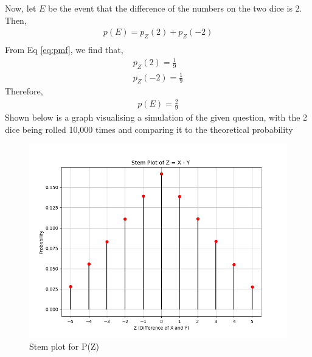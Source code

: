 \documentclass[]{article}
\begin{document}
Now, let $E$ be the event that the difference of the numbers on the two dice is 2. Then,
\begin{align}
  p(E) = p_Z(2) +p_Z(-2)\\
\end{align}
From Eq \eqref{eq:pmf}, we find that,
\begin{align}
  p_Z(2) = \frac{1}{9} \\
  p_Z(-2) = \frac{1}{9}
\end{align}
Therefore,
\begin{align}
  p(E)=\frac{2}{9}
\end{align}
Shown below is a graph visualising a simulation of the given question, with the 2 dice being rolled 10,000 times and comparing it to the theoretical probability
\begin{figure}[h]
  \includegraphics[width=\columnwidth]{./figs/Z.png}
  \caption{Stem plot for P(Z)}
  \label{fig:exemplar/10/13/3/1/Z/}
\end{figure}
\end{document}
